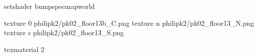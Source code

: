 setshader bumpspecmapworld

texture 0 philipk2/pk02_floor13b_C.png
texture n philipk2/pk02_floor13_N.png
texture s philipk2/pk02_floor13_S.png

texmaterial 2
